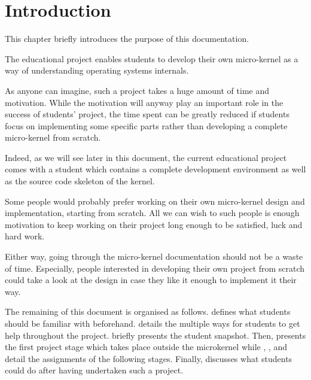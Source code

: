 %
%
%
%
%
%

%
%

\chapter{Introduction}
\label{chapter:introduction}

This chapter briefly introduces the purpose of this documentation.

\newpage

%
%

The  educational project enables students to develop their own
micro-kernel as a way of understanding operating systems internals.

As anyone can imagine, such a project takes a huge amount of time and
motivation. While the motivation will anyway play an important role in the
success of students' project, the time spent can be greatly reduced if
students focus on implementing some specific parts rather than developing a
complete micro-kernel from scratch.

Indeed, as we will see later in this document, the current 
educational project comes with a student  which contains
a complete development environment as well as the source code skeleton of
the kernel.

Some people would probably prefer working on their own micro-kernel design
and implementation, starting from scratch. All we can wish to such people
is enough motivation to keep working on their project long enough to be
satisfied, luck and hard work.

Either way, going through the  micro-kernel documentation
should not be a waste of time. Especially, people interested in developing
their own project from scratch could take a look at the  design
in case they like it enough to implement it their way.

The remaining of this document is organised as follows.  defines what students should be familiar with
beforehand.  details the multiple
ways for students to get help throughout the project.  briefly presents the student snapshot. Then,
 presents the first project stage
which takes place outside the microkernel while , ,  and  detail the
assignments of the following stages. Finally,  discusses what students could do after having
undertaken such a project.
